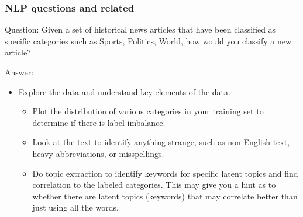 \documentclass[11pt]{beamer}
\begin{document}
\begin{frame}
\frametitle{NLP questions and related}
\begin{block}{Question:}
	Given a set of historical news articles that have been classified as specific categories such as Sports, Politics, World, how would you classify a new article?
\end{block}
\begin{block}{Answer:}
	\begin{itemize}
		\item Explore the data and understand key elements of the data.
		\begin{itemize}
			\item Plot the distribution of various categories in your training set to determine if there is label imbalance.
			\item Look at the text to identify anything strange, such as non-English text, heavy abbreviations, or misspellings.
			\item Do topic extraction to identify keywords for specific latent topics and find correlation to the labeled categories. This may give you a hint as to whether there are latent topics (keywords) that may correlate better than just using all the words.
		\end{itemize}
	\end{itemize}
\end{block}
\end{frame}
\end{document}
